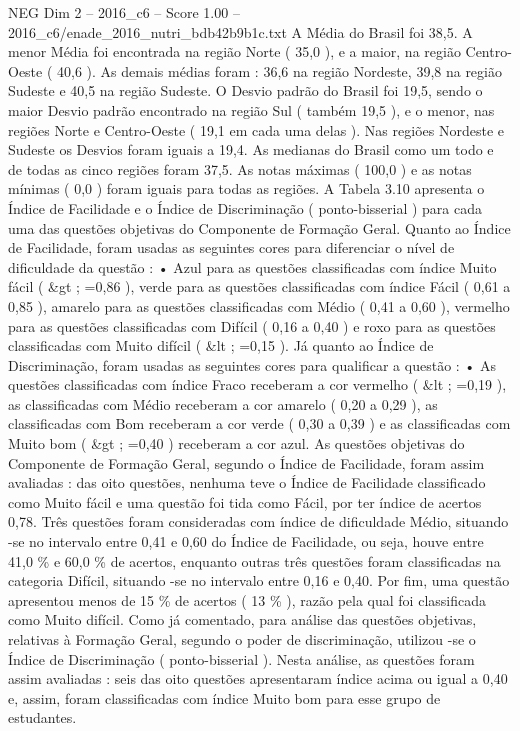 \begin{textsample}{NEG Dim 2 – 2016\_c6 – Score 1.00 – 2016\_c6/enade\_2016\_nutri\_bdb42b9b1c.txt}
A Média do Brasil foi 38,5.
A menor Média foi encontrada na região Norte ( 35,0 ), e a maior, na região Centro-Oeste ( 40,6 ).
As demais médias foram : 36,6 na região Nordeste, 39,8 na região Sudeste e 40,5 na região Sudeste.
O Desvio padrão do Brasil foi 19,5, sendo o maior Desvio padrão encontrado na região Sul ( também 19,5 ), e o menor, nas regiões Norte e Centro-Oeste ( 19,1 em cada uma delas ).
Nas regiões Nordeste e Sudeste os Desvios foram iguais a 19,4.
As medianas do Brasil como um todo e de todas as cinco regiões foram 37,5.
As notas máximas ( 100,0 ) e as notas mínimas ( 0,0 ) foram iguais para todas as regiões.
A Tabela 3.10 apresenta o Índice de Facilidade e o Índice de Discriminação ( ponto-bisserial ) para cada uma das questões objetivas do Componente de Formação Geral.
Quanto ao Índice de Facilidade, foram usadas as seguintes cores para diferenciar o nível de dificuldade da questão : • Azul para as questões classificadas com índice Muito fácil ( \&gt ; =0,86 ), verde para as questões classificadas com índice Fácil ( 0,61 a 0,85 ), amarelo para as questões classificadas com Médio ( 0,41 a 0,60 ), vermelho para as questões classificadas com Difícil ( 0,16 a 0,40 ) e roxo para as questões classificadas com Muito difícil ( \&lt ; =0,15 ).
Já quanto ao Índice de Discriminação, foram usadas as seguintes cores para qualificar a questão : • As questões classificadas com índice Fraco receberam a cor vermelho ( \&lt ; =0,19 ), as classificadas com Médio receberam a cor amarelo ( 0,20 a 0,29 ), as classificadas com Bom receberam a cor verde ( 0,30 a 0,39 ) e as classificadas com Muito bom ( \&gt ; =0,40 ) receberam a cor azul.
As questões objetivas do Componente de Formação Geral, segundo o Índice de Facilidade, foram assim avaliadas : das oito questões, nenhuma teve o Índice de Facilidade classificado como Muito fácil e uma questão foi tida como Fácil, por ter índice de acertos 0,78.
Três questões foram consideradas com índice de dificuldade Médio, situando -se no intervalo entre 0,41 e 0,60 do Índice de Facilidade, ou seja, houve entre 41,0 \% e 60,0 \% de acertos, enquanto outras três questões foram classificadas na categoria Difícil, situando -se no intervalo entre 0,16 e 0,40.
Por fim, uma questão apresentou menos de 15 \% de acertos ( 13 \% ), razão pela qual foi classificada como Muito difícil.
Como já comentado, para análise das questões objetivas, relativas à Formação Geral, segundo o poder de discriminação, utilizou -se o Índice de Discriminação ( ponto-bisserial ).
Nesta análise, as questões foram assim avaliadas : seis das oito questões apresentaram índice acima ou igual a 0,40 e, assim, foram classificadas com índice Muito bom para esse grupo de estudantes.

\end{textsample}
